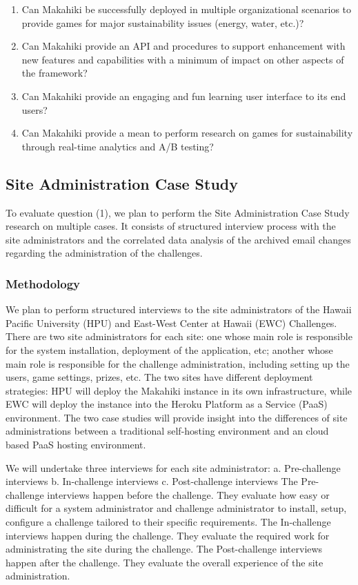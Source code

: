 \documentclass[11pt]{article}
\begin{document}
\begin{enumerate}

\em \item Can Makahiki be successfully deployed in multiple organizational scenarios to provide games for major sustainability issues (energy, water, etc.)? \em
\em \item Can Makahiki provide an API and procedures to support enhancement with new features and capabilities with a minimum of impact on other aspects of the framework? \em
\em \item Can Makahiki provide an engaging and fun learning user interface to its end users? \em
\em \item Can Makahiki provide a mean to perform research on games for sustainability through real-time analytics and A/B testing? \em

\end{enumerate}

\subsection{Site Administration Case Study}
To evaluate question (1), we plan to perform the Site Administration Case Study research on multiple cases. It consists of structured interview process with the site administrators and the correlated data analysis of the archived email changes regarding the administration of the challenges.

\subsubsection{Methodology}

We plan to perform structured interviews to the site administrators of the Hawaii Pacific University (HPU) and East-West Center at Hawaii (EWC) Challenges. There are two site administrators for each site: one whose main role is responsible for the system installation, deployment of the application, etc; another whose main role is responsible for the challenge administration, including setting up the users, game settings, prizes, etc. The two sites have different deployment strategies: HPU will deploy the Makahiki instance in its own infrastructure, while EWC will deploy the instance into the Heroku Platform as a Service (PaaS) environment. The two case studies will provide insight into the differences of site administrations between a traditional self-hosting environment and an cloud based PaaS hosting environment.

We will undertake three interviews for each site administrator:
a. Pre-challenge interviews
b. In-challenge interviews
c. Post-challenge interviews
The Pre-challenge interviews happen before the challenge. They evaluate how easy or difficult for a system administrator and challenge administrator to install, setup, configure a challenge tailored to their specific requirements. The In-challenge interviews happen during the challenge. They evaluate the required work for administrating the site during the challenge. The Post-challenge interviews happen after the challenge. They evaluate the overall experience of the site administration.
\end{document}
